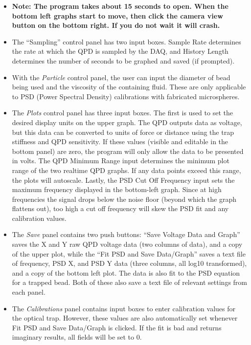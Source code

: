 \documentclass{../lab}
\begin{document}
\begin{itemize}
    \item \textbf{Note: The program takes about 15 seconds to open. When the bottom left graphs start to move, then click the camera view button on the bottom right. If you do not wait it will crash.}

    \item The ``Sampling'' control panel has two input boxes. Sample Rate determines the rate at which the QPD is sampled by the DAQ, and History Length determines the number of seconds to be graphed and saved (if prompted).

    \item With the \emph{Particle} control panel, the user can input the diameter of bead being used and the viscosity of the containing fluid. These are only applicable to PSD (Power Spectral Density) calibrations with fabricated microspheres.

    \item The \emph{Plots} control panel has three input boxes. The first is used to set the desired display units on the upper graph. The QPD outputs data as voltage, but this data can be converted to units of force or distance using the trap stiffness and QPD sensitivity. If these values (visible and editable in the bottom panel) are zero, the program will only allow the data to be presented in volts. The QPD Minimum Range input determines the minimum plot range of the two realtime QPD graphs. If any data points exceed this range, the plots will autoscale. Lastly, the PSD Cut Off Frequency input sets the maximum frequency displayed in the bottom-left graph. Since at high frequencies the signal drops below the noise floor (beyond which the graph flattens out), too high a cut off frequency will skew the PSD fit and any calibration values.

\newpage

    \item The \emph{Save} panel contains two push buttons: ``Save Voltage Data and Graph'' saves the X and Y raw QPD voltage data (two columns of data), and a copy of the upper plot, while the ``Fit PSD and Save Data/Graph'' saves a text file of frequency, PSD X, and PSD Y data (three columns, all log10 transformed), and a copy of the bottom left plot. The data is also fit to the PSD equation for a trapped bead. Both of these also save a text file of relevant settings from each panel.

    \item The \emph{Calibrations} panel contains input boxes to enter calibration values for the optical trap. However, these values are also automatically set whenever Fit PSD and Save Data/Graph is clicked. If the fit is bad and returns imaginary results, all fields will be set to 0.


\end{itemize}
\end{document}
